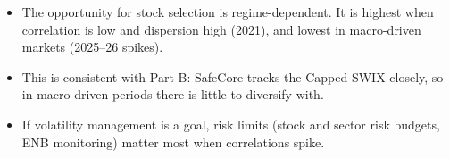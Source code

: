 \documentclass[11pt,preprint]{elsarticle}
\numberwithin{equation}{section}
\numberwithin{figure}{section}
\numberwithin{table}{section}
\def\tightlist{} %
\begin{document}
\begin{itemize}
\tightlist
\item
  The opportunity for stock selection is regime-dependent. It is highest
  when correlation is low and dispersion high (2021), and lowest in
  macro-driven markets (2025--26 spikes).
\item
  This is consistent with Part B: SafeCore tracks the Capped SWIX
  closely, so in macro-driven periods there is little to diversify with.
\item
  If volatility management is a goal, risk limits (stock and sector risk
  budgets, ENB monitoring) matter most when correlations spike.
\end{itemize}


\end{document}
